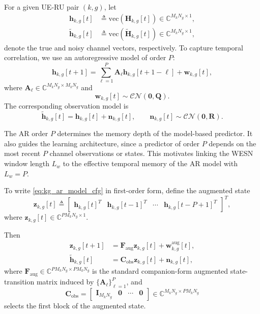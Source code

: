 \documentclass[lettersize,journal]{IEEEtran}
\begin{document}
For a given UE-RU pair $(k,g)$, let
\begin{align}
\mathbf{h}_{k,g}[t]
&\triangleq
\mathrm{vec}\!\left(\mathbf{H}_{k,g}[t]\right)
\in
\mathbb{C}^{M_kN_g \times 1},\\
\tilde{\mathbf{h}}_{k,g}[t]
&\triangleq
\mathrm{vec}\!\left(\tilde{\mathbf{H}}_{k,g}[t]\right)
\in
\mathbb{C}^{M_kN_g \times 1},
\end{align}
denote the true and noisy channel vectors, respectively. To capture temporal correlation, we use an autoregressive model of order $P$:
\begin{equation}
\mathbf{h}_{k,g}[t+1]
=
\sum_{\ell=1}^{P}
\mathbf{A}_{\ell}\mathbf{h}_{k,g}[t+1-\ell]
+
\mathbf{w}_{k,g}[t],
\label{eq:kg_ar_model_cfg}
\end{equation}
where $\mathbf{A}_{\ell}\in\mathbb{C}^{M_kN_g\times M_kN_g}$ and
\begin{equation}
\mathbf{w}_{k,g}[t]\sim\mathcal{CN}(\mathbf{0},\mathbf{Q}).
\end{equation}
The corresponding observation model is
\begin{equation}
\tilde{\mathbf{h}}_{k,g}[t]
=
\mathbf{h}_{k,g}[t]
+
\mathbf{n}_{k,g}[t],
\qquad
\mathbf{n}_{k,g}[t]\sim\mathcal{CN}(\mathbf{0},\mathbf{R}).
\label{eq:kg_obs_model_cfg}
\end{equation}

The AR order $P$ determines the memory depth of the model-based predictor. It also guides the learning architecture, since a predictor of order $P$ depends on the most recent $P$ channel observations or states. 
This motivates linking the WESN window length $L_w$ to the effective temporal memory of the AR model with $L_w = P$.

To write \eqref{eq:kg_ar_model_cfg} in first-order form, define the augmented state
\begin{equation}
\mathbf{z}_{k,g}[t]
\triangleq
\begin{bmatrix}
\mathbf{h}_{k,g}[t]^T &
\mathbf{h}_{k,g}[t-1]^T &
\cdots &
\mathbf{h}_{k,g}[t-P+1]^T
\end{bmatrix}^{T},
\label{eq:kg_aug_state_cfg}
\end{equation}
where $\mathbf{z}_{k,g}[t]\in
\mathbb{C}^{PM_kN_g \times 1}$.

Then
\begin{align}
\mathbf{z}_{k,g}[t+1]
&=
\mathbf{F}_{\mathrm{aug}}\mathbf{z}_{k,g}[t]
+
\mathbf{w}^{\mathrm{aug}}_{k,g}[t],\\
\tilde{\mathbf{h}}_{k,g}[t]
&=
\mathbf{C}_{\mathrm{obs}}\mathbf{z}_{k,g}[t]
+
\mathbf{n}_{k,g}[t],
\label{eq:kg_obs_aug_cfg}
\end{align}
where $\mathbf{F}_{\mathrm{aug}}\in\mathbb{C}^{PM_kN_g\times PM_kN_g}$ is the standard companion-form augmented state-transition matrix induced by $\{\mathbf{A}_{\ell}\}_{\ell=1}^{P}$, and
\begin{equation}
\mathbf{C}_{\mathrm{obs}}
=
\begin{bmatrix}
\mathbf{I}_{M_kN_g} & \mathbf{0} & \cdots & \mathbf{0}
\end{bmatrix}
\in
\mathbb{C}^{M_kN_g \times PM_kN_g}
\label{eq:c_obs_def}
\end{equation}
selects the first block of the augmented state.
\end{document}
